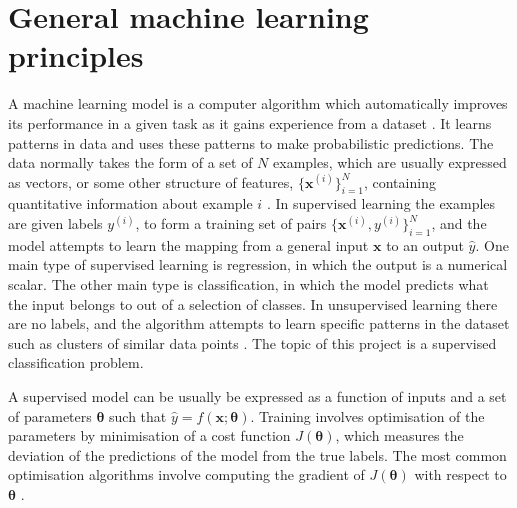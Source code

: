 \documentclass[12pt]{article}
\begin{document}
\section{General machine learning principles}
A machine learning model is a computer algorithm which automatically improves its performance in a given task as it gains experience from a dataset \cite{Goodfellow16}. It learns patterns in data and uses these patterns to make probabilistic predictions. The data normally takes the form of a set of $N$ examples, which are usually expressed as vectors, or some other structure of features, $\{\bm{x}^{(i)}\}_{i=1}^N$, containing quantitative information about example $i$ \cite{Murphy12}. In supervised learning the examples are given labels $y^{(i)}$, to form a training set of pairs $\{\bm{x}^{(i)}, y^{(i)}\}_{i=1}^N$, and the model attempts to learn the mapping from a general input $\bm{x}$ to an output $\hat{y}$. One main type of supervised learning is regression, in which the output is a numerical scalar. The other main type is classification, in which the model predicts what the input belongs to out of a selection of classes. In unsupervised learning there are no labels, and the algorithm attempts to learn specific patterns in the dataset such as clusters of similar data points \cite{Murphy12}. The topic of this project is a supervised classification problem.

A supervised model can be usually be expressed as a function of inputs and a set of parameters $\boldsymbol\theta$ such that $\hat{y}=f(\bm{x};\boldsymbol\theta)$. Training involves optimisation of the parameters by minimisation of a cost function $J(\boldsymbol\theta)$, which measures the deviation of the predictions of the model from the true labels. The most common optimisation algorithms involve computing the gradient of $J(\boldsymbol\theta)$ with respect to $\boldsymbol\theta$ \cite{Goodfellow16}. 
\end{document}
